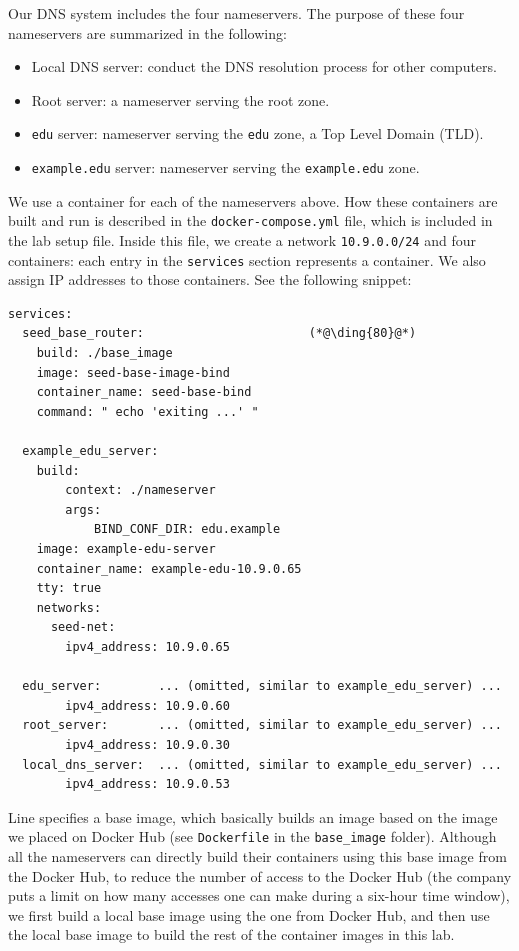 Our DNS system includes the four nameservers. 
The purpose of these four nameservers are summarized in the following:

\begin{itemize}[nosep]
\item Local DNS server: conduct the DNS resolution process for other computers.
\item Root server: a nameserver serving the root zone.
\item \texttt{edu} server: nameserver serving the \texttt{edu} zone, a Top Level Domain (TLD).  
\item \texttt{example.edu} server: nameserver serving the \texttt{example.edu} zone. 
\end{itemize}


We use a container for each of the nameservers above. 
How these containers are built and run is described in 
the \texttt{docker-compose.yml} file, which is included in
the lab setup file. Inside this file, we create a network \texttt{10.9.0.0/24}
and four containers: each entry in the \texttt{services} section represents
a container. We also assign IP addresses to those containers. 
See the following snippet:

\begin{lstlisting}
services:
  seed_base_router:                       (*@\ding{80}@*)
    build: ./base_image
    image: seed-base-image-bind
    container_name: seed-base-bind
    command: " echo 'exiting ...' "

  example_edu_server:
    build:
        context: ./nameserver
        args:
            BIND_CONF_DIR: edu.example
    image: example-edu-server
    container_name: example-edu-10.9.0.65
    tty: true
    networks:
      seed-net:
        ipv4_address: 10.9.0.65

  edu_server:        ... (omitted, similar to example_edu_server) ...
        ipv4_address: 10.9.0.60
  root_server:       ... (omitted, similar to example_edu_server) ...
        ipv4_address: 10.9.0.30
  local_dns_server:  ... (omitted, similar to example_edu_server) ...
        ipv4_address: 10.9.0.53
\end{lstlisting}

Line  specifies a base image, which basically builds an 
image based on the  image 
we placed on Docker Hub (see \texttt{Dockerfile} in the \texttt{base\_image} folder). 
Although all the nameservers can directly build their containers using
this base image from the Docker Hub, to reduce
the number of access to the Docker Hub (the company
puts a limit on how many accesses one can make
during a six-hour time window), we first build a
local base image using the one from Docker Hub, and then
use the local base image to build the rest of the
container images in this lab.


